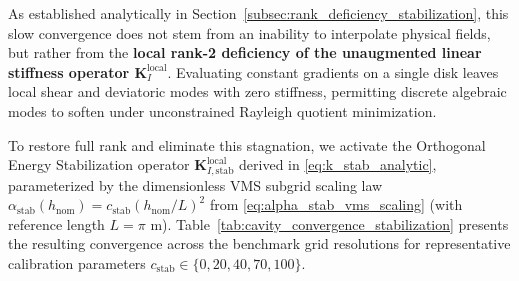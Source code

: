 \documentclass[preprint,12pt]{elsarticle}
\begin{document}
As established analytically in Section~\ref{subsec:rank_deficiency_stabilization}, this slow convergence does not stem from an inability to interpolate physical fields, but rather from the \textbf{local rank-2 deficiency of the unaugmented linear stiffness operator $\mathbf{K}_I^{\mathrm{local}}$}. Evaluating constant gradients on a single disk leaves local shear and deviatoric modes with zero stiffness, permitting discrete algebraic modes to soften under unconstrained Rayleigh quotient minimization.

To restore full rank and eliminate this stagnation, we activate the Orthogonal Energy Stabilization operator $\mathbf{K}_{I, \mathrm{stab}}^{\mathrm{local}}$ derived in \eqref{eq:k_stab_analytic}, parameterized by the dimensionless VMS subgrid scaling law $\alpha_{\mathrm{stab}}(h_{\mathrm{nom}}) = c_{\mathrm{stab}} (h_{\mathrm{nom}}/L)^2$ from \eqref{eq:alpha_stab_vms_scaling} (with reference length $L = \pi\text{ m}$). Table~\ref{tab:cavity_convergence_stabilization} presents the resulting convergence across the benchmark grid resolutions for representative calibration parameters $c_{\mathrm{stab}} \in \{0, 20, 40, 70, 100\}$.
\end{document}
